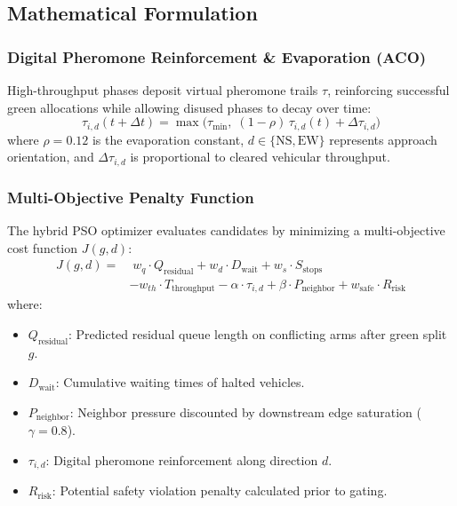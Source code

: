 \documentclass[11pt,a4paper]{article}
\begin{document}
\subsection{Mathematical Formulation}

\subsubsection{Digital Pheromone Reinforcement \& Evaporation (ACO)}
High-throughput phases deposit virtual pheromone trails $\tau$, reinforcing successful green allocations while allowing disused phases to decay over time:
\begin{equation}
\tau_{i, d}(t + \Delta t) = \max\Big(\tau_{\min}, \; (1 - \rho)\,\tau_{i, d}(t) + \Delta \tau_{i, d}\Big)
\end{equation}
where $\rho = 0.12$ is the evaporation constant, $d \in \{\text{NS}, \text{EW}\}$ represents approach orientation, and $\Delta \tau_{i, d}$ is proportional to cleared vehicular throughput.

\subsubsection{Multi-Objective Penalty Function}
The hybrid PSO optimizer evaluates candidates by minimizing a multi-objective cost function $J(g, d)$:
\begin{equation}
\begin{aligned}
J(g, d) = &\; w_q \cdot Q_{\text{residual}} + w_d \cdot D_{\text{wait}} + w_s \cdot S_{\text{stops}} \\
&- w_{th} \cdot T_{\text{throughput}} - \alpha \cdot \tau_{i, d} + \beta \cdot P_{\text{neighbor}} + w_{\text{safe}} \cdot R_{\text{risk}}
\end{aligned}
\end{equation}
where:
\begin{itemize}
    \item $Q_{\text{residual}}$: Predicted residual queue length on conflicting arms after green split $g$.
    \item $D_{\text{wait}}$: Cumulative waiting times of halted vehicles.
    \item $P_{\text{neighbor}}$: Neighbor pressure discounted by downstream edge saturation ($\gamma = 0.8$).
    \item $\tau_{i, d}$: Digital pheromone reinforcement along direction $d$.
    \item $R_{\text{risk}}$: Potential safety violation penalty calculated prior to gating.
\end{itemize}
\end{document}
